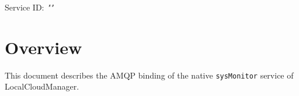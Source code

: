 \documentclass[a4paper]{arrowhead}
\begin{document}
\sloppy

\ArrowheadSetup

\begin{center}
  \vspace*{1cm}
  \huge{\arrowtitle}

  \vspace*{0.2cm}
  \LARGE{\arrowtype}
  \vspace*{1cm}

  \Large{Service ID: \textit{"\arrowid"}}

  \vspace*{\fill}


  \vspace*{1cm}
  \vspace*{\fill}

  \begin{abstract}
    This document describes the AMQP 0-9-1 protocol with TLS payload security and JSON payload encoding variant of the \texttt{sysMonitor} service of the LocalCloudManager system (SysMonitor-AMQP-IDD-5.2.2).
  \end{abstract}

  \vspace*{1cm}
\end{center}

\newpage

\tableofcontents
\newpage

\section{Overview}
\label{sec:overview}

This document describes the AMQP binding of the native \texttt{sysMonitor} service of LocalCloudManager.
\end{document}
